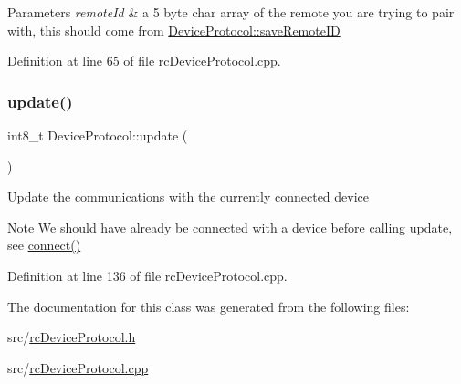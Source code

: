 \begin{DoxyParams}{Parameters}
{\em remote\+Id} & a 5 byte char array of the remote you are trying to pair with, this should come from \hyperlink{classDeviceProtocol_a1d33bbf35f5c6e7bb888eb06fc50c070}{Device\+Protocol\+::save\+Remote\+ID} \\
\hline
\end{DoxyParams}


Definition at line 65 of file rc\+Device\+Protocol.\+cpp.

\mbox{\label{classDeviceProtocol_ac08e4aca1a8265b1a3fe2182252ed812}} 
\subsubsection{\texorpdfstring{update()}{update()}}
{\footnotesize\ttfamily int8\+\_\+t Device\+Protocol\+::update (\begin{DoxyParamCaption}{ }\end{DoxyParamCaption})}

Update the communications with the currently connected device

\begin{DoxyNote}{Note}
We should have already be connected with a device before calling update, see \hyperlink{classDeviceProtocol_a099b7b72a19262ab5ff19a41c9ce0a9e}{connect()} 
\end{DoxyNote}


Definition at line 136 of file rc\+Device\+Protocol.\+cpp.



The documentation for this class was generated from the following files\+:\begin{DoxyCompactItemize}
\item 
src/\hyperlink{rcDeviceProtocol_8h}{rc\+Device\+Protocol.\+h}\item 
src/\hyperlink{rcDeviceProtocol_8cpp}{rc\+Device\+Protocol.\+cpp}\end{DoxyCompactItemize}
